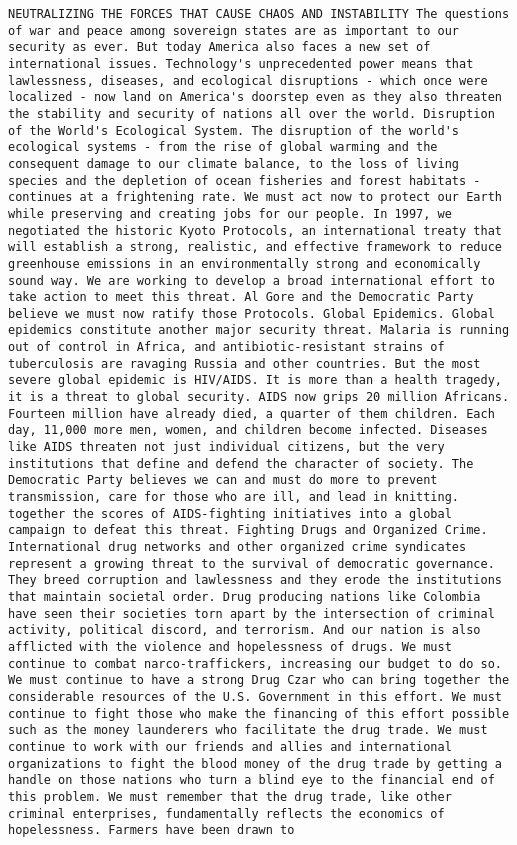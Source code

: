 \documentclass[
]{article}
\begin{document}
\begin{verbatim}
NEUTRALIZING THE FORCES THAT CAUSE CHAOS AND INSTABILITY The questions of war and peace among sovereign states are as important to our security as ever. But today America also faces a new set of international issues. Technology's unprecedented power means that lawlessness, diseases, and ecological disruptions - which once were localized - now land on America's doorstep even as they also threaten the stability and security of nations all over the world. Disruption of the World's Ecological System. The disruption of the world's ecological systems - from the rise of global warming and the consequent damage to our climate balance, to the loss of living species and the depletion of ocean fisheries and forest habitats - continues at a frightening rate. We must act now to protect our Earth while preserving and creating jobs for our people. In 1997, we negotiated the historic Kyoto Protocols, an international treaty that will establish a strong, realistic, and effective framework to reduce greenhouse emissions in an environmentally strong and economically sound way. We are working to develop a broad international effort to take action to meet this threat. Al Gore and the Democratic Party believe we must now ratify those Protocols. Global Epidemics. Global epidemics constitute another major security threat. Malaria is running out of control in Africa, and antibiotic-resistant strains of tuberculosis are ravaging Russia and other countries. But the most severe global epidemic is HIV/AIDS. It is more than a health tragedy, it is a threat to global security. AIDS now grips 20 million Africans. Fourteen million have already died, a quarter of them children. Each day, 11,000 more men, women, and children become infected. Diseases like AIDS threaten not just individual citizens, but the very institutions that define and defend the character of society. The Democratic Party believes we can and must do more to prevent transmission, care for those who are ill, and lead in knitting. together the scores of AIDS-fighting initiatives into a global campaign to defeat this threat. Fighting Drugs and Organized Crime. International drug networks and other organized crime syndicates represent a growing threat to the survival of democratic governance. They breed corruption and lawlessness and they erode the institutions that maintain societal order. Drug producing nations like Colombia have seen their societies torn apart by the intersection of criminal activity, political discord, and terrorism. And our nation is also afflicted with the violence and hopelessness of drugs. We must continue to combat narco-traffickers, increasing our budget to do so. We must continue to have a strong Drug Czar who can bring together the considerable resources of the U.S. Government in this effort. We must continue to fight those who make the financing of this effort possible such as the money launderers who facilitate the drug trade. We must continue to work with our friends and allies and international organizations to fight the blood money of the drug trade by getting a handle on those nations who turn a blind eye to the financial end of this problem. We must remember that the drug trade, like other criminal enterprises, fundamentally reflects the economics of hopelessness. Farmers have been drawn to 
\end{verbatim}
\end{document}
